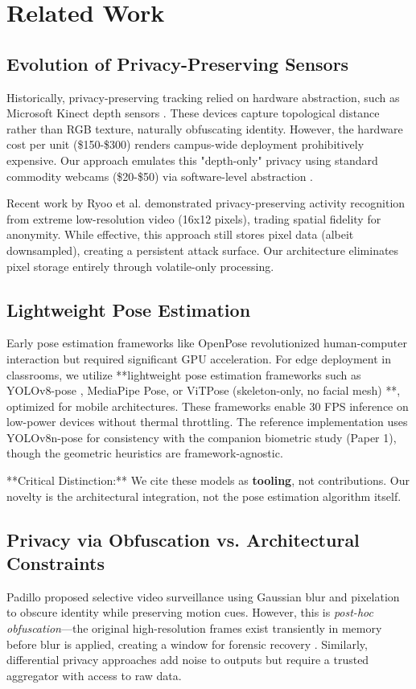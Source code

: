 \documentclass[conference]{IEEEtran}
\begin{document}
\section{Related Work}

\subsection{Evolution of Privacy-Preserving Sensors}
Historically, privacy-preserving tracking relied on hardware abstraction, such as Microsoft Kinect depth sensors \cite{b9}. These devices capture topological distance rather than RGB texture, naturally obfuscating identity. However, the hardware cost per unit (\$150-\$300) renders campus-wide deployment prohibitively expensive. Our approach emulates this "depth-only" privacy using standard commodity webcams (\$20-\$50) via software-level abstraction \cite{b7}.

Recent work by Ryoo et al. \cite{b5} demonstrated privacy-preserving activity recognition from extreme low-resolution video (16x12 pixels), trading spatial fidelity for anonymity. While effective, this approach still stores pixel data (albeit downsampled), creating a persistent attack surface. Our architecture eliminates pixel storage entirely through volatile-only processing.

\subsection{Lightweight Pose Estimation}
Early pose estimation frameworks like OpenPose \cite{b10} revolutionized human-computer interaction but required significant GPU acceleration. For edge deployment in classrooms, we utilize **lightweight pose estimation frameworks such as YOLOv8-pose \cite{b23}, MediaPipe Pose, or ViTPose (skeleton-only, no facial mesh) \cite{b6, b11, b12}**, optimized for mobile architectures. These frameworks enable 30 FPS inference on low-power devices without thermal throttling. The reference implementation uses YOLOv8n-pose for consistency with the companion biometric study (Paper 1), though the geometric heuristics are framework-agnostic.

**Critical Distinction:** We cite these models as \textbf{tooling}, not contributions. Our novelty is the architectural integration, not the pose estimation algorithm itself.

\subsection{Privacy via Obfuscation vs. Architectural Constraints}
Padillo \cite{b3} proposed selective video surveillance using Gaussian blur and pixelation to obscure identity while preserving motion cues. However, this is \textit{post-hoc obfuscation}—the original high-resolution frames exist transiently in memory before blur is applied, creating a window for forensic recovery \cite{b21}. Similarly, differential privacy approaches \cite{b5} add noise to outputs but require a trusted aggregator with access to raw data.
\end{document}
